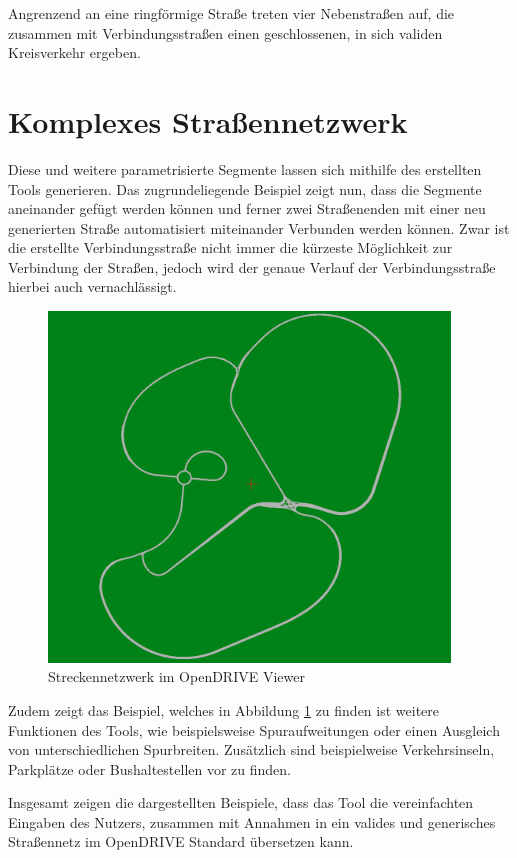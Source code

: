 Angrenzend an eine ringförmige Straße treten vier Nebenstraßen auf, die zusammen mit Verbindungsstraßen einen geschlossenen, in sich validen Kreisverkehr ergeben.

\section{Komplexes Straßennetzwerk}

Diese und weitere parametrisierte Segmente lassen sich mithilfe des erstellten Tools generieren. Das zugrundeliegende Beispiel zeigt nun, dass die Segmente aneinander gefügt werden können und ferner zwei Straßenenden mit einer neu generierten Straße automatisiert miteinander Verbunden werden können. Zwar ist die erstellte Verbindungsstraße nicht immer die kürzeste Möglichkeit zur Verbindung der Straßen, jedoch wird der genaue Verlauf der Verbindungsstraße hierbei auch vernachlässigt.

\begin{figure}[H]
\flushleft
\includegraphics[width=0.95\textwidth]{fig/fig8.png}
\caption{Streckennetzwerk im OpenDRIVE Viewer}
\label{abb8}
\end{figure}

Zudem zeigt das Beispiel, welches in Abbildung \ref{abb8} zu finden ist weitere Funktionen des Tools, wie beispielsweise Spuraufweitungen oder einen Ausgleich von unterschiedlichen Spurbreiten. Zusätzlich sind beispielweise Verkehrsinseln, Parkplätze oder Bushaltestellen vor zu finden.

Insgesamt zeigen die dargestellten Beispiele, dass das Tool die vereinfachten Eingaben des Nutzers, zusammen mit Annahmen in ein valides und generisches Straßennetz im OpenDRIVE Standard übersetzen kann.

